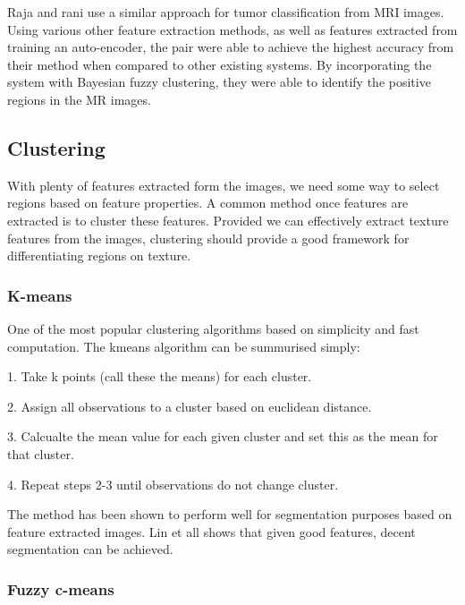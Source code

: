 \documentclass[a4]{article}
\begin{document}
  

Raja and rani \cite{siva2020brain} use a similar approach for tumor classification from MRI images. Using various other feature extraction methods, as well as features extracted from training an auto-encoder, the pair were able to achieve the highest accuracy from their method when compared to other existing systems. By incorporating the system with Bayesian fuzzy clustering, they were able to identify the positive regions in the MR images. 

\subsection*{Clustering}

With plenty of features extracted form the images, we need some way to select regions based on feature properties. A common method once features are extracted is to cluster these features. Provided we can effectively extract texture features from the images, clustering should provide a good framework for differentiating regions on texture. 

\subsubsection*{K-means}

One of the most popular clustering algorithms based on simplicity and fast computation. The kmeans algorithm can be summurised simply: 

  

1. Take k points (call these the means) for each cluster. 

2. Assign all observations to a cluster based on euclidean distance. 

3. Calcualte the mean value for each given cluster and set this as the mean for that cluster. 

4. Repeat steps 2-3 until observations do not change cluster. 

  

The method has been shown to perform well for segmentation purposes based on feature extracted images. Lin et all \cite{lin2010image} shows that given good features, decent segmentation can be achieved. 

 

\subsubsection*{Fuzzy c-means}
\end{document}

